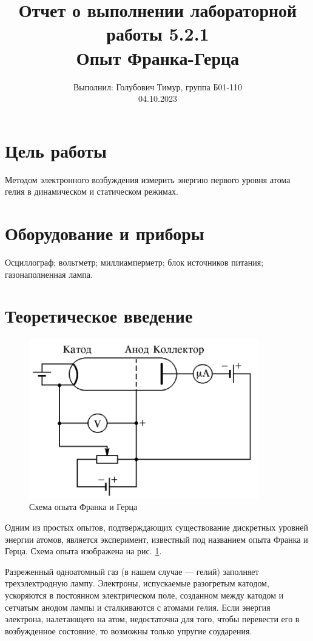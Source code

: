 \documentclass[12pt,a4paper]{article}
\author{\normalsize Выполнил: Голубович Тимур, группа Б01-110 \\
    	\normalsize 04.10.2023}
\date{}
\title{
    	\large Отчет о выполнении лабораторной работы 5.2.1 \\
    	\Large Опыт Франка-Герца
     }
\begin{document}
    	\maketitle

    \section*{Цель работы}

    Методом электронного возбуждения измерить энергию первого уровня атома гелия в динамическом и статическом режимах.

    \section*{Оборудование и приборы}

    Осциллограф; вольтметр; миллиамперметр; блок источников питания; газонаполненная лампа.
	
    \section*{Теоретическое введение}

    \begin{figure}[h!]
		\centering
		\includegraphics[width=10cm]{res/scheme.png}
		\caption{Схема опыта Франка и Герца}
		\label{Experiment}
	\end{figure}
	
	Одним из простых опытов, подтверждающих существование дискретных уровней энергии атомов, является эксперимент, известный под названием опыта Франка и Герца. Схема опыта изображена на рис. \ref{Experiment}.
	
	Разреженный одноатомный газ (в нашем случае — гелий) заполняет трехэлектродную лампу. Электроны, испускаемые разогретым катодом, ускоряются в постоянном электрическом поле, созданном между катодом и сетчатым анодом лампы и сталкиваются с атомами гелия. Если энергия электрона, налетающего на атом, недостаточна для того, чтобы перевести его в возбужденное состояние, то возможны только упругие соударения.
	
\end{document}
